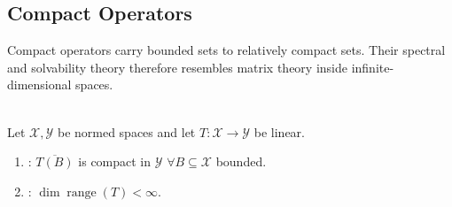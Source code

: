 \subsection{Compact Operators}

%

Compact operators carry bounded sets to relatively compact sets. Their spectral and solvability theory therefore resembles matrix theory inside infinite-dimensional spaces.

\begin{definition} \label{def:compact-and-finite-rank-operators} \\
Let $\mathcal{X},\mathcal{Y}$ be normed spaces and let $T:\mathcal{X}\to\mathcal{Y}$ be linear.
\begin{enumerate}[label=(\roman*)]
\setlength{\itemsep}{0pt}
\item {}: $\overline{T(B)}$ is compact in $\mathcal{Y}$ $\forall B\subseteq\mathcal{X}$ bounded.
\item {}: $\dim\operatorname{range}(T)<\infty$.
\end{enumerate}
\end{definition}

